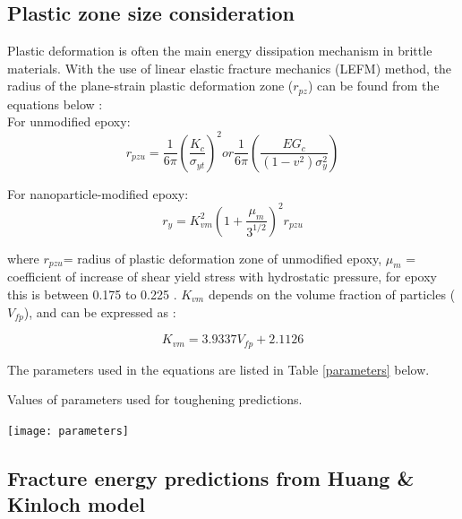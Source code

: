 \documentclass[numbers=noendperiod,chapterprefix=on]{icldt} %
\begin{document}
\subsection{Plastic zone size consideration}
Plastic deformation is often the main energy dissipation mechanism in brittle materials. With the use of linear elastic fracture mechanics (LEFM) method, the radius of the plane-strain plastic deformation zone ($r_{pz}$) can be found from the equations below \cite{Chen2013}:\\

For unmodified epoxy: \\

\begin{equation} 
r_{pzu}=\frac{1}{6π}
\left( \frac {K_c}{\sigma_{yt}}\right) ^2 or \frac {1}{6π}  \left(\frac{EG_c}{(1-v^2)\sigma_y^2}\right) 
\end{equation}

For nanoparticle-modified epoxy: \\
\begin{equation}
r_y=K_{vm}^2
\left(1+\frac {\mu_m}{3^{1/2}}\right)^2r_{pzu}
\end{equation}

where $r_{pzu}$= radius of plastic deformation zone of unmodified epoxy, $\mu_m$ = coefficient of increase of shear yield stress with hydrostatic pressure, for epoxy this is between 0.175 to 0.225 \cite{Chen2013}.
$ K_{vm} $ depends on the volume fraction of particles ($V_{fp}$), and can be expressed as \cite{Mohammed2007}: 

\begin{equation} 
K_{vm}=3.9337V_{fp}+2.1126
\end{equation}

The parameters used in the equations are listed in Table \ref{parameters} below.

\begin{table}[!htpb]
\centering
\caption{Values of parameters used for toughening predictions.} \label{parameters}
\texttt{[image: parameters]}
\end{table}
\FloatBarrier

\subsection{Fracture energy predictions from Huang \& Kinloch model} \label{Fracture_model_results}
\end{document}
